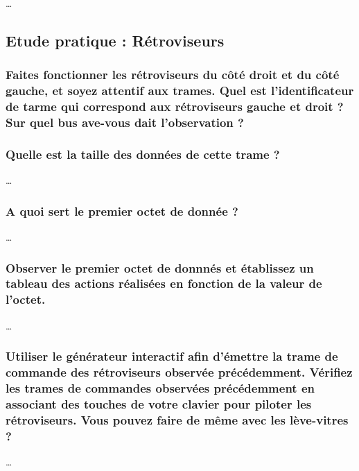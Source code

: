 \documentclass{rapportECC}
\begin{document}
\dots


\subsection{Etude pratique : Rétroviseurs}

\subsubsection*{Faites fonctionner les rétroviseurs du côté droit et du côté gauche, et soyez attentif aux trames. Quel est l'identificateur de tarme qui correspond aux rétroviseurs gauche et droit ?  Sur quel bus ave-vous dait l'observation ?}

\subsubsection*{Quelle est la taille des données de cette trame ?}

\dots

\subsubsection*{A quoi sert le premier octet de donnée ?}

\dots

\subsubsection*{Observer le premier octet de donnnés et établissez un tableau des actions  réalisées en fonction de la valeur de l'octet.}

\dots

\subsubsection*{Utiliser le générateur interactif afin d'émettre la trame de commande des rétroviseurs observée précédemment. Vérifiez les trames de commandes observées précédemment en associant des touches de votre clavier pour piloter les rétroviseurs. Vous pouvez faire de même avec les lève-vitres ?}

\dots

\end{document}
